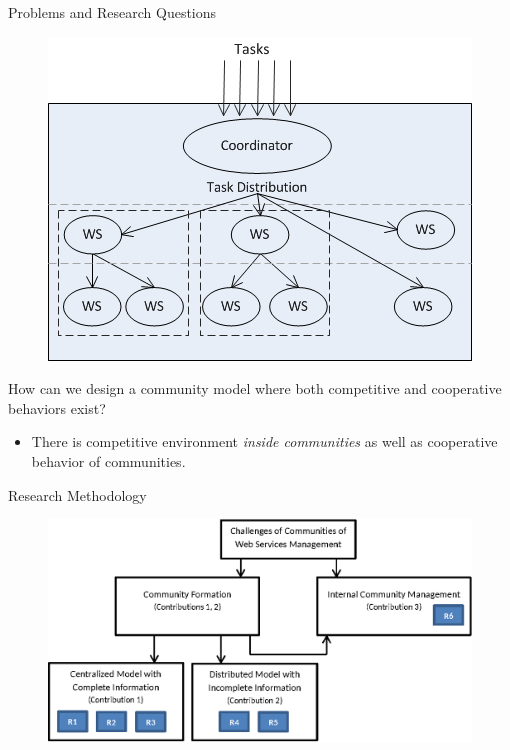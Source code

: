 \documentclass{beamer}
\begin{document}
\begin{frame}{Problems and Research Questions}
    \begin{figure}[h]
        \centering
         \includegraphics[scale=0.5]{figures/rq3.png}
        \label{architectureFigure}
    \end{figure}

    \footnotesize{\colorbox{blue}{\color{white}{R6}} How can we design a community model where both competitive and cooperative behaviors exist?}\\
        \begin{itemize}
            \item There is competitive environment \emph{inside communities} as well as cooperative behavior of communities.
        \end{itemize}
            
\end{frame}

\begin{frame}{Research Methodology}
    \begin{figure}[htbp]
        \centering
        \includegraphics[width=0.9 \columnwidth]{figures/model.eps}
    \end{figure}
\end{frame}
\end{document}
